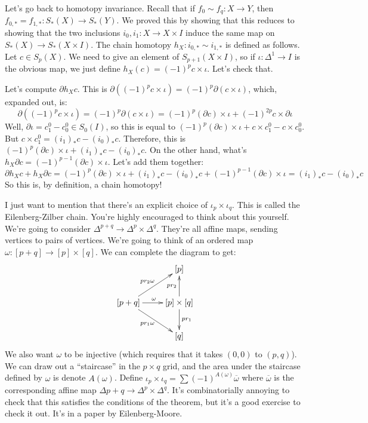 Let's go back to homotopy invariance. Recall that if $f_0\sim f_q:X\to Y$, then $f_{0,\ast}=f_{1,\ast}:S_\ast(X)\to S_\ast(Y)$. We proved this by showing that this reduces to showing that the two inclusions $i_0,i_1:X\to X\times I$ induce the same map on $S_\ast(X)\to S_\ast(X\times I)$. The chain homotopy $h_X:i_{0,\ast}\sim i_{1,\ast}$ is defined as follows. Let $c\in S_p(X)$. We need to give an element of $S_{p+1}(X\times I)$, so if $\iota:\Delta^1\to I$ is the obvious map, we just define $h_X(c)=(-1)^p c\times\iota$. Let's check that.

Let's compute $\partial h_Xc$. This is $\partial((-1)^p c\times \iota)=(-1)^p\partial(c\times\iota)$, which, expanded out, is:
	\begin{equation*}
	\partial((-1)^p c\times \iota)=(-1)^p\partial(c\times\iota)=(-1)^p(\partial c)\times\iota+(-1)^{2p}c\times\partial\iota
	\end{equation*}
Well, $\partial\iota=c_1^0-c_0^0\in S_0(I)$, so this is equal to $(-1)^p(\partial c)\times\iota+c\times c^0_1 - c\times c_0^0$. But $c\times c^0_1=(i_1)_\ast c-(i_0)_\ast c$. Therefore, this is $(-1)^p(\partial c)\times\iota + (i_1)_\ast c-(i_0)_\ast c$. On the other hand, what's $h_X\partial c=(-1)^{p-1}(\partial c)\times\iota$. Let's add them together:
	\begin{equation*}
	\partial h_Xc+h_X\partial c=(-1)^p(\partial c)\times\iota + (i_1)_\ast c-(i_0)_\ast c+(-1)^{p-1}(\partial c)\times\iota=(i_1)_\ast c - (i_0)_\ast c
	\end{equation*}
So this is, by definition, a chain homotopy!

I just want to mention that there's an explicit choice of $\iota_p\times\iota_q$. This is called the Eilenberg-Zilber chain. You're highly encouraged to think about this yourself. We're going to consider $\Delta^{p+q}\to\Delta^p\times\Delta^q$. They're all affine maps, sending vertices to pairs of vertices. We're going to think of an ordered map $\omega:[p+q]\to[p]\times[q]$. We can complete the diagram to get:
	\begin{equation*}
	\xymatrix{ & [p]\\
	[p+q]\ar[ur]^{pr_2\omega}\ar[dr]_{pr_1\omega}\ar[r]^\omega & [p]\times[q]\ar[u]^{pr_2}\ar[d]^{pr_1}\\
	 & [q]}
	\end{equation*}
We also want $\omega$ to be injective (which requires that it takes $(0,0)$ to $(p,q)$). We can draw out a ``staircase'' in the $p\times q$ grid, and the area under the staircase defined by $\omega$ is denote $A(\omega)$. Define $\iota_p\times\iota_q=\sum(-1)^{A(\omega)}\overline{\omega}$ where $\overline{\omega}$ is the corresponding affine map $\Delta{p+q}\to\Delta^p\times\Delta^q$. It's combinatorially annoying to check that this satisfies the conditions of the theorem, but it's a good exercise to check it out. It's in a paper by Eilenberg-Moore.
